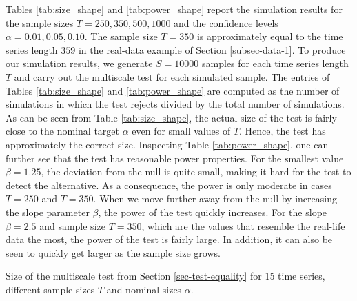 Tables \ref{tab:size_shape} and \ref{tab:power_shape} report the simulation results for the sample sizes $T=250,350,500, 1000$ and the confidence levels $\alpha = 0.01, 0.05, 0.10$. The sample size $T = 350$ is approximately equal to the time series length $359$ in the real-data example of Section \ref{subsec-data-1}. To produce our simulation results, we generate $S=10000$ samples for each time series length $T$ and carry out the multiscale test for each simulated sample. The entries of Tables \ref{tab:size_shape} and \ref{tab:power_shape} are computed as the number of simulations in which the test rejects divided by the total number of simulations. As can be seen from Table \ref{tab:size_shape}, the actual size of the test is fairly close to the nominal target $\alpha$ even for small values of $T$. Hence, the test has approximately the correct size. Inspecting Table \ref{tab:power_shape}, one can further see that the test has reasonable power properties. For the smallest value $\beta = 1.25$, the deviation from the null is quite small, making it hard for the test to detect the alternative. As a consequence, the power is only moderate in cases $T=250$ and $T=350$. When we move further away from the null by increasing the slope parameter $\beta$, the power of the test quickly increases. For the slope $\beta =2.5$ and sample size $T=350$, which are the values that resemble the real-life data the most, the power of the test is fairly large. In addition, it can also be seen to quickly get larger as the sample size grows. 
 


\begin{table}[t]
\footnotesize{
\begin{center}
\caption{Size of the multiscale test from Section \ref{sec-test-equality} for 15 time series, different sample sizes $T$ and nominal sizes $\alpha$.}
\label{tab:size_equality}
\renewcommand{\arraystretch}{1.2}

\end{center}}
\end{table}

